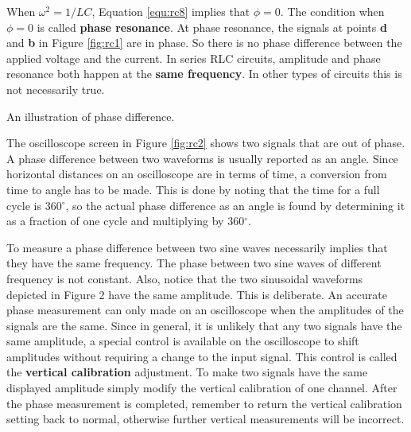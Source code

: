 When $\omega^2 = 1/LC$, Equation \ref{equ:rc8} implies that $\phi = 0$. The condition when $\phi  = 0$ is called {\bf phase resonance}. At phase resonance, the signals at points {\bf d} and {\bf b} in Figure \ref{fig:rc1} are in phase. So there is no phase difference between the applied voltage and the current. In series RLC circuits, amplitude and phase resonance both happen at the {\bf same frequency}. In other types of circuits this is not necessarily true.

\begin{marginfigure}
\caption{An illustration of phase difference.}
\label{fig:rc2}
\end{marginfigure}

The oscilloscope screen in Figure \ref{fig:rc2} shows two signals that are out of phase. A phase difference between two waveforms is usually reported as an angle. Since horizontal distances on an oscilloscope are in terms of time, a conversion from time to angle has to be made. This is done by noting that the time for a full cycle is 360$^{\circ}$, so the actual phase difference as an angle is found by determining it as a fraction of one cycle and multiplying by 360$^{\circ}$.

To measure a phase difference between two sine waves necessarily implies that they have the same frequency. The phase between two sine waves of different frequency is not constant. Also, notice that the two sinusoidal waveforms depicted in Figure 2 have the same amplitude. This is deliberate. An accurate phase measurement can only made on an oscilloscope when the amplitudes of the signals are the same. Since in general, it is unlikely that any two signals have the same amplitude, a special control is available on the oscilloscope to shift amplitudes without requiring a change to the input signal. This control is called the {\bf vertical calibration} adjustment. To make two signals have the same displayed amplitude simply modify the vertical calibration of one channel. After the phase measurement is completed, remember to return the vertical calibration setting back to normal, otherwise further vertical measurements will be incorrect.

